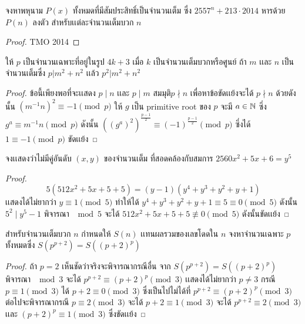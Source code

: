 \documentclass[a4paper,12pt]{scrartcl}
\begin{document}
	\begin{example}
		จงหาพหุนาม $P(x)$ ทั้งหมดที่มีสัมประสิทธิ์เป็นจำนวนเต็ม ซึ่ง $2557^n+213\cdot2014$ หารด้วย $P(n)$ ลงตัว สำหรับเเต่ละจำนวนเต็มบวก $n$
	\end{example}
\begin{proof}
	TMO 2014
\end{proof}
	\begin{example}
		ให้ $p$ เป็นจำนวนเฉพาะที่อยู่ในรูป $4k+3$ เมื่อ $k$ เป็นจำนวนเต็มบวกหรือศูนย์ ถ้า $m$ เเละ $n$ เป็นจำนวนเต็มซึ่ง $p|m^2+n^2$ เเล้ว $p^2|m^2+n^2$
	\end{example}
\begin{proof}
	ข้อนี้เพียงพอที่จะเเสดง $p\mid n$ เเละ $p \mid m$ สมมุติ$p\nmid n$ เพื่อหาข้อขัดเเย้งจะได้ $p\nmid n$ ด้วยดังนั้น $(m^{-1}n)^2 \equiv -1 \pmod p$ ให้ $g$ เป็น primitive root ของ $p$ จะมี $a \in \mathbb N$ ซึ่ง $g^a \equiv m^{-1}n \pmod p$ ดังนั้น $((g^a)^2)^{\frac{p-1}{2}} \equiv (-1)^{\frac{p-1}{2}} \pmod p$ ซึ่งได้ $1 \equiv -1 \pmod{p} $ ขัดเเย้ง
\end{proof}

	\begin{example}
		จงเเสดงว่าไม่มีคู่อันดับ $(x,y)$ ของจำนวนเต็ม ที่สอดคล้องกับสมการ $2560x^2+5x+6 = y^5$
	\end{example}
\begin{proof}
	\[ 5(512x^2+5x+5+5) = (y-1)(y^4+y^3+y^2+y+1) \] เเสดงได้ไม่ยากว่า  $ y\equiv1 \pmod 5$ ทำให้ได้  $y^4+y^3+y^2+y+1 \equiv 5 \equiv 0 \pmod 5$  ดังนั้น $5^2 \mid y^5-1$ พิจารณา $\mod 5$ จะได้ $512x^2+5x+5+5 \not \equiv 0 \pmod 5$ ดังนั้นขัดเเย้ง
\end{proof}
	\begin{example}
		สำหรับจำนวนเต็มบวก $n$ กำหนดให้ $S(n)$ เเทนผลรวมของเลขโดดใน $n$ จงหาจำนวนเฉพาะ $p$ \\ทั้งหมดซึ่ง $S(p^{p+2})=S((p+2)^p)$
	\end{example}
\begin{proof}
	ถ้า $p =2$ เห็นชัดว่าจริงจะพิจารณากรณีอื่น จาก $S(p^{p+2})=S((p+2)^p)$ พิจารณา $\mod 3$ จะได้ $p^{p+2} \equiv (p+2)^p \pmod 3$ เเสดงได้ไม่ยากว่า $p\neq3$ กรณี $p \equiv 1 \pmod 3 $ ได้ $p+2 \equiv 0 \pmod 3 $ ซึ่งเป็นไปไม่ได้ที่ $p^{p+2} \equiv (p+2)^p \pmod 3$ ต่อไปจะพิจารณากรณี $p \equiv 2 \pmod 3 $ จะได้ $p+2 \equiv 1 \pmod 3 $ จะได้ $p^{p+2} \equiv 2 \pmod 3 $ เเละ $(p+2)^p \equiv 1 \pmod 3 $ ซึ่งขัดเเย้ง
\end{proof}
\end{document}
